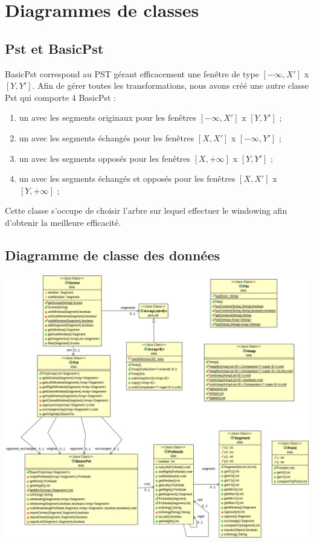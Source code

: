 \documentclass[10pt,a4paper]{article}
\begin{document}
\section{Diagrammes de classes}
\subsection{Pst et BasicPst}
BasicPst correspond au PST gérant efficacement une fenêtre de type $[-\infty, X']$ x $[Y, Y']$. Afin de gérer toutes les transformations, nous avons créé une autre classe Pst qui comporte 4 BasicPst :
\begin{enumerate}
	\item un avec les segments originaux pour les fenêtres $[-\infty, X']$ x $[Y, Y']$ ;
	\item un avec les segments échangés pour les fenêtres $[X, X']$ x $[-\infty, Y']$ ;
	\item un avec les segments opposés pour les fenêtres $[X, +\infty]$ x $[Y, Y']$ ;
	\item un avec les segments échangés et opposés pour les fenêtres $[X, X']$ x $[Y, +\infty]$ ;
\end{enumerate}

Cette classe s'occupe de choisir l'arbre sur lequel effectuer le windowing afin d'obtenir la meilleure efficacité.

\subsection{Diagramme de classe des données}
\includegraphics[scale=0.3]{../src/UML/data.png}
\end{document}
